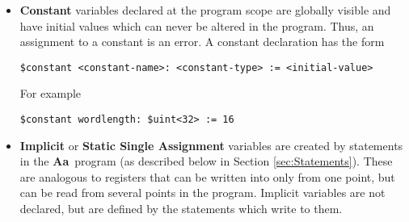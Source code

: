 \documentclass{article}
\newcommand{\Aa}{{\bf Aa}~}
\begin{document}
\begin{itemize}
\begin{itemize}
written into, is assumed to have a source outside the program.
Such a pipe is an input port of the program.
\end{itemize}
A pipe declaration has the form
\begin{verbatim}
($lifo | $noblock)? $pipe <pipe-name>: <pipe-type>  ($depth <integer>)?
\end{verbatim}
For example
\begin{verbatim}
$pipe myfifo: $uint<32> $depth 16 // 16-slot queue
$lifo $pipe mystack: $uint<32> $depth 4 // 4-slot stack
$noblock $pipe cmd_pipe: $uint<8> // non-blocking reads.
\end{verbatim}
A non-blocking pipe when read, will deliver $0$ if
it does not contain data (thus, you will have to reserve
the $0$ for invalid data).

Pipe variable declarations can also be appended by
the following keywords:
\begin{verbatim}
   ($in | $out)? ($signal)? 
\end{verbatim}
These additional keywords mean the following things:
\begin{itemize}
\item Inclusion of ``\$in'' (respectively ``\$out'') means
that the pipe is a read-only (respectively write-only) object.
\item The ``\$signal'' keyword means that the pipe behaves
like a variable.  That is, it remembers the last value
that was written to it.    
\end{itemize}
Pipe depths can be specified by parameters or parameter
expressions.
\item {\bf Constant} variables declared at
the program scope are globally visible and have
initial values which can never be altered in the program.
Thus, an assignment to a constant is an error.
A constant declaration has the form
\begin{verbatim}
$constant <constant-name>: <constant-type> := <initial-value>
\end{verbatim}
For example
\begin{verbatim}
$constant wordlength: $uint<32> := 16
\end{verbatim}
\item {\bf Implicit} or {\bf Static Single Assignment}
variables are created by statements in the \Aa program
(as described below in Section \ref{sec:Statements}).
These are analogous to registers that can be written
into only from one point,  but can be
read from several points in the program.
Implicit variables are not declared, but are defined
by the statements which write to them.
\end{itemize} 
\end{document}
